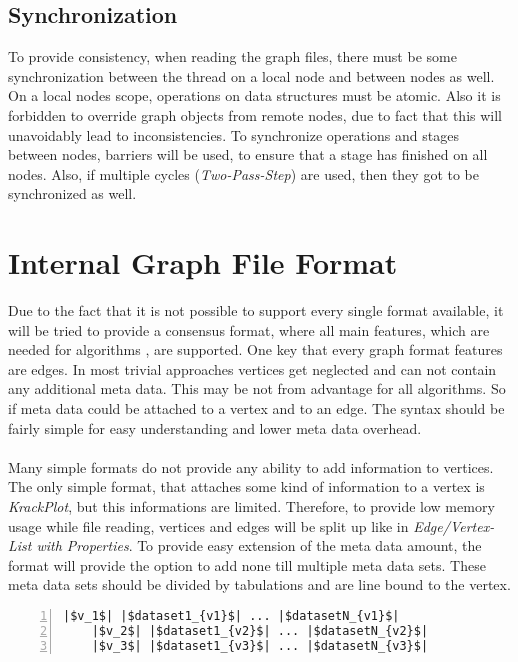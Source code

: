 \subsection{Synchronization}
To provide consistency, when reading the graph files, there must be some synchronization between the thread on a local node and between nodes as well. On a local nodes scope, operations on data structures must be atomic. Also it is forbidden to override graph objects from remote nodes, due to fact that this will unavoidably lead to inconsistencies. To synchronize operations and stages between nodes, barriers will be used, to ensure that a stage has finished on all nodes. Also, if multiple cycles (\textit{Two-Pass-Step}) are used, then they got to be synchronized as well.


\section{Internal Graph File Format}
Due to the fact that it is not possible to support every single format available, it will be tried to provide a consensus format, where all main features, which are needed for algorithms , are supported. One key that every graph format features are edges. In most trivial approaches vertices get neglected and can not contain any additional meta data. This may be not from advantage for all algorithms. So if meta data could be attached to a vertex and to an edge. The syntax should be fairly simple for easy understanding and lower meta data overhead.\\\\
Many simple formats do not provide any ability to add information to vertices. The only simple format, that attaches some kind of information to a vertex is \textit{KrackPlot}, but this informations are limited. Therefore, to provide low memory usage while file reading, vertices and edges will be split up like in \textit{Edge/Vertex-List with Properties}. To provide easy extension of the meta data amount, the format will provide the option to add none till multiple meta data sets. These meta data sets should be divided by tabulations and are line bound to the vertex.\\
\noindent\begin{minipage}{.48\textwidth}
	\begin{lstlisting}[numbers=left,
	stepnumber=1,showlines=true,caption={Vertex File},captionpos=b, linewidth={\textwidth}, escapeinside=||,gobble = 4]
	|$v_1$| |$dataset1_{v1}$| ... |$datasetN_{v1}$|
	|$v_2$| |$dataset1_{v2}$| ... |$datasetN_{v2}$|
	|$v_3$| |$dataset1_{v3}$| ... |$datasetN_{v3}$|
	\end{lstlisting}
\end{minipage}\hfill
